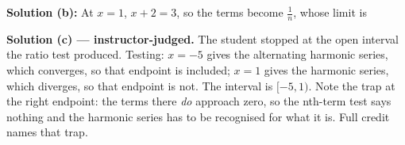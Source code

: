 \documentclass[12pt]{article}
\begin{document}
\textbf{Solution (b):} At $x = 1$, $x + 2 = 3$, so the terms become $\frac1n$, whose limit is 

\textbf{Solution (c) --- instructor-judged.} The student stopped at the open interval the ratio test produced. Testing: $x = -5$ gives the alternating harmonic series, which converges, so that endpoint is included; $x = 1$ gives the harmonic series, which diverges, so that endpoint is not. The interval is $[-5, 1)$. Note the trap at the right endpoint: the terms there \emph{do} approach zero, so the nth-term test says nothing and the harmonic series has to be recognised for what it is. Full credit names that trap.
\end{document}

